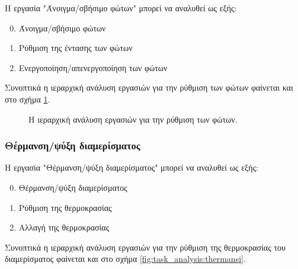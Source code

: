 \documentclass{assignment}
\begin{document}
Η εργασία "Άνοιγμα/σβήσιμο φώτων" μπορεί να αναλυθεί ως εξής:

\begin{enumerate}
\setcounter{enumi}{-1}
\item Άνοιγμα/σβήσιμο φώτων
\item Ρύθμιση της έντασης των φώτων
\item Ενεργοποίηση/απενεργοποίηση των φώτων
\end{enumerate}

Συνοπτικά η ιεραρχική ανάλυση εργασιών για την ρύθμιση των φώτων φαίνεται και στο σχήμα \ref{fig:task_analysis:fota}.

\begin{figure}
\begin{center}
\caption{Η ιεραρχική ανάλυση εργασιών για την ρύθμιση των φώτων.}
\label{fig:task_analysis:fota}
\end{center}
\end{figure}



\subsubsection{Θέρμανση/ψύξη διαμερίσματος}

Η εργασία "Θέρμανση/ψύξη διαμερίσματος" μπορεί να αναλυθεί ως εξής:

\begin{enumerate}
\setcounter{enumi}{-1}
\item Θέρμανση/ψύξη διαμερίσματος
\item Ρύθμιση της θερμοκρασίας
\item Αλλαγή της θερμοκρασίας
\end{enumerate}

Συνοπτικά η ιεραρχική ανάλυση εργασιών για την ρύθμιση της θερμοκρασίας του διαμερίσματος φαίνεται και στο σχήμα \ref{fig:task_analysis:thermansi}.
\end{document}

